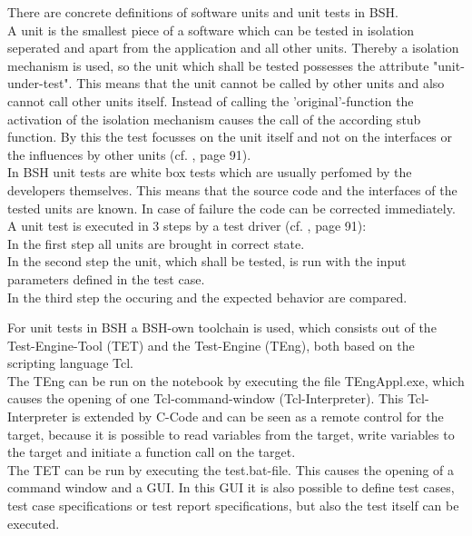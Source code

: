 There are concrete definitions of software units and unit tests in BSH.
\\
A unit is the smallest piece of a software which can be tested in isolation seperated and apart from the application and all other units. Thereby a isolation mechanism is used, so the unit which shall be tested possesses the attribute "unit-under-test". This means that the unit cannot be called by other units and also cannot call other units itself. Instead of calling the 'original'-function the activation of the isolation mechanism causes the call of the according stub function. By this the test focusses on the unit itself and not on the interfaces or the influences by other units (cf. \cite{Grue13}, page 91). 
\\
In BSH unit tests are white box tests which are usually perfomed by the developers themselves. This means that the source code and the interfaces of the tested units are known. In case of failure the code can be corrected immediately.
\\
A unit test is executed in 3 steps by a test driver (cf. \cite{Grue13}, page 91):
\\
In the first step all units are brought in correct state.
\\
In the second step the unit, which shall be tested, is run with the input parameters defined in the test case. 
\\
In the third step the occuring and the expected behavior are compared.







For unit tests in BSH a BSH-own toolchain is used, which consists out of the Test-Engine-Tool (TET) and the Test-Engine (TEng), both based on the scripting language Tcl. 
\\
The TEng can be run on the notebook by executing the file TEngAppl.exe, which causes the opening of one Tcl-command-window (Tcl-Interpreter). This Tcl-Interpreter is extended by C-Code and can be seen as a remote control for the target, because it is possible to read variables from the target, write variables to the target and initiate a function call on the target. 
\\
The TET can be run by executing the test.bat-file. This causes the opening of a command window and a GUI. In this GUI it is also possible to define test cases, test case specifications or test report specifications, but also the test itself can be executed. 







